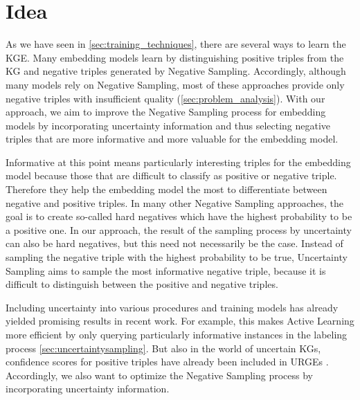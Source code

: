\section{Idea} 
\label{sec:idea}


As we have seen in \autoref{sec:training_techniques}, there are several ways to learn the \ac{KGE}.
Many embedding models learn by distinguishing positive triples from the \ac{KG} and negative triples generated by Negative Sampling.
Accordingly, although many models rely on Negative Sampling, most of these approaches provide only negative triples with insufficient quality (\autoref{sec:problem_analysis}).
With our approach, we aim to improve the Negative Sampling process for embedding models by incorporating uncertainty information and thus selecting negative triples that are more informative and more valuable for the embedding model.

Informative at this point means particularly interesting triples for the embedding model because those that are difficult to classify as positive or negative triple.
Therefore they help the embedding model the most to differentiate between negative and positive triples.
In many other Negative Sampling approaches, the goal is to create so-called hard negatives which have the highest probability to be a positive one.
In our approach, the result of the sampling process by uncertainty can also be hard negatives, but this need not necessarily be the case.
Instead of sampling the negative triple with the highest probability to be true, Uncertainty Sampling aims to sample the most informative negative triple, because it is difficult to distinguish between the positive and negative triples.

Including uncertainty into various procedures and training models has already yielded promising results in recent work.
For example, this makes Active Learning more efficient by only querying particularly informative instances in the labeling process \autoref{sec:uncertaintysampling}.
But also in the world of uncertain \acp{KG}, confidence scores for positive triples have already been included in \acp{URGE} \cite{UKGE}.
Accordingly, we also want to optimize the Negative Sampling process by incorporating uncertainty information.

